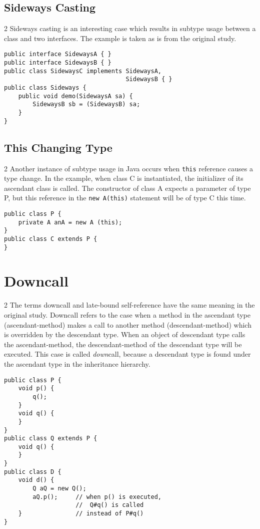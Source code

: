 \documentclass{uvamscse}
\begin{document}
\subsection{Sideways Casting}
\begin{multicols} {2}
Sideways casting is an interesting case which results in subtype usage between a class and two interfaces. The example is taken as is from the original study.
\columnbreak
\begin{verbatim}
public interface SidewaysA { }
public interface SidewaysB { }
public class SidewaysC implements SidewaysA, 
                                  SidewaysB { }
public class Sideways {
    public void demo(SidewaysA sa) {
        SidewaysB sb = (SidewaysB) sa;
    }
}
\end{verbatim}
\end{multicols}

\subsection{This Changing Type}
\begin{multicols} {2}
Another instance of subtype usage in Java occurs when \texttt{this} reference causes a type change. In the example, when class C is instantiated, the initializer of its ascendant class is called. The constructor of class A expects a parameter of type P, but this reference in the \texttt{new A(this)} statement will be of type C this time.

\columnbreak
\begin{verbatim}
public class P {
    private A anA = new A (this);
}
public class C extends P {
}
\end{verbatim}
\end{multicols}

\section{Downcall}
\begin{multicols} {2}
The terms downcall and late-bound self-reference have the same meaning in the original study. Downcall refers to the case when a method in the ascendant type (ascendant-method) makes a call to another method (descendant-method) which is overridden by the descendant type. When an object of descendant type calls the ascendant-method, the descendant-method of the descendant type will be executed. This case is called \textit{down}call, because a descendant type is found under the ascendant type in the inheritance hierarchy.
\columnbreak
\begin{verbatim}
public class P {
    void p() {
        q();
    }
    void q() {
    }
}
public class Q extends P {
    void q() {
    }
}
public class D {
    void d() {
        Q aQ = new Q();
        aQ.p();     // when p() is executed,
                    //  Q#q() is called
    }               // instead of P#q()
}
\end{verbatim}
\end{multicols}
\end{document}
